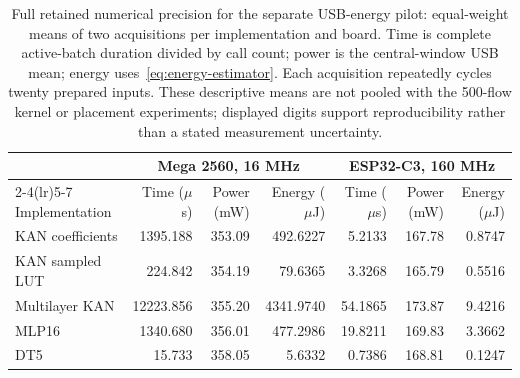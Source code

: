 \begin{table}[p]
\caption{Full retained numerical precision for the separate USB-energy pilot: equal-weight means of two acquisitions per implementation and board. Time is complete active-batch duration divided by call count; power is the central-window USB mean; energy uses~\eqref{eq:energy-estimator}. Each acquisition repeatedly cycles twenty prepared inputs. These descriptive means are not pooled with the 500-flow kernel or placement experiments; displayed digits support reproducibility rather than a stated measurement uncertainty.}
\label{tab:energy-pilots-full}
\centering\small\setlength{\tabcolsep}{5pt}
\begin{tabular}{lrrrrrr}
\toprule
& \multicolumn{3}{c}{Mega 2560, 16 MHz} & \multicolumn{3}{c}{ESP32-C3, 160 MHz}\\
\cmidrule(lr){2-4}\cmidrule(lr){5-7}
Implementation & Time ($\mu$s) & Power (mW) & Energy ($\mu$J) & Time ($\mu$s) & Power (mW) & Energy ($\mu$J)\\
\midrule
KAN coefficients & 1395.188 & 353.09 & 492.6227 & 5.2133 & 167.78 & 0.8747\\
KAN sampled LUT & 224.842 & 354.19 & 79.6365 & 3.3268 & 165.79 & 0.5516\\
Multilayer KAN & 12223.856 & 355.20 & 4341.9740 & 54.1865 & 173.87 & 9.4216\\
MLP16 & 1340.680 & 356.01 & 477.2986 & 19.8211 & 169.83 & 3.3662\\
DT5 & 15.733 & 358.05 & 5.6332 & 0.7386 & 168.81 & 0.1247\\
\bottomrule
\end{tabular}
\end{table}
